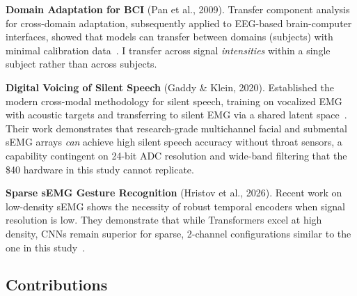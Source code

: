 \documentclass{article}
\begin{document}
\textbf{Domain Adaptation for BCI} (Pan et al., 2009). Transfer component analysis for cross-domain adaptation, subsequently applied to EEG-based brain-computer interfaces, showed that models can transfer between domains (subjects) with minimal calibration data~\cite{pan2011}. I transfer across signal \emph{intensities} within a single subject rather than across subjects.

\textbf{Digital Voicing of Silent Speech} (Gaddy \& Klein, 2020). Established the modern cross-modal methodology for silent speech, training on vocalized EMG with acoustic targets and transferring to silent EMG via a shared latent space~\cite{gaddy2020}. Their work demonstrates that research-grade multichannel facial and submental sEMG arrays \emph{can} achieve high silent speech accuracy without throat sensors, a capability contingent on 24-bit ADC resolution and wide-band filtering that the \$40 hardware in this study cannot replicate.

\textbf{Sparse sEMG Gesture Recognition} (Hristov et al., 2026). Recent work on low-density sEMG shows the necessity of robust temporal encoders when signal resolution is low. They demonstrate that while Transformers excel at high density, CNNs remain superior for sparse, 2-channel configurations similar to the one in this study~\cite{hristov2026}.

\subsection{Contributions}
\end{document}
